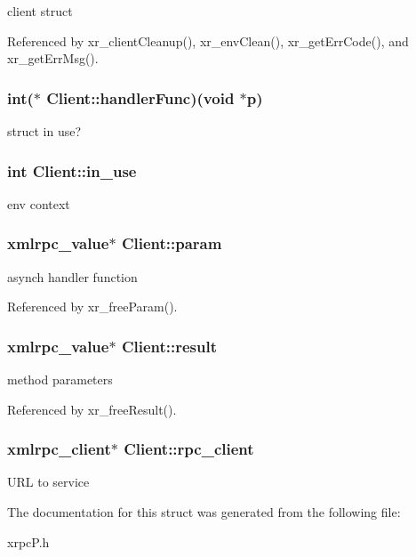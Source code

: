 client struct 

Referenced by xr\_\-clientCleanup(), xr\_\-envClean(), xr\_\-getErrCode(), and xr\_\-getErrMsg().\hypertarget{structClient_883a4aa7cd951660a7835ca5242bdfc7}{
\subsubsection[{handlerFunc}]{\setlength{\rightskip}{0pt plus 5cm}int($\ast$ {\bf Client::handlerFunc})(void $\ast$p)}}
\label{structClient_883a4aa7cd951660a7835ca5242bdfc7}


struct in use? \hypertarget{structClient_5869e4fdb3a1a88b14faa4f2dda27c66}{
\subsubsection[{in\_\-use}]{\setlength{\rightskip}{0pt plus 5cm}int {\bf Client::in\_\-use}}}
\label{structClient_5869e4fdb3a1a88b14faa4f2dda27c66}


env context \hypertarget{structClient_e4d1bc206122b68b2def984a105ed189}{
\subsubsection[{param}]{\setlength{\rightskip}{0pt plus 5cm}xmlrpc\_\-value$\ast$ {\bf Client::param}}}
\label{structClient_e4d1bc206122b68b2def984a105ed189}


asynch handler function 

Referenced by xr\_\-freeParam().\hypertarget{structClient_5985ff24d5b811f1c96b8a083d6e0e31}{
\subsubsection[{result}]{\setlength{\rightskip}{0pt plus 5cm}xmlrpc\_\-value$\ast$ {\bf Client::result}}}
\label{structClient_5985ff24d5b811f1c96b8a083d6e0e31}


method parameters 

Referenced by xr\_\-freeResult().\hypertarget{structClient_d4a6025c88f880e4bf4060f2018c5695}{
\subsubsection[{rpc\_\-client}]{\setlength{\rightskip}{0pt plus 5cm}xmlrpc\_\-client$\ast$ {\bf Client::rpc\_\-client}}}
\label{structClient_d4a6025c88f880e4bf4060f2018c5695}


URL to service 

The documentation for this struct was generated from the following file:\begin{CompactItemize}
\item 
xrpcP.h\end{CompactItemize}
